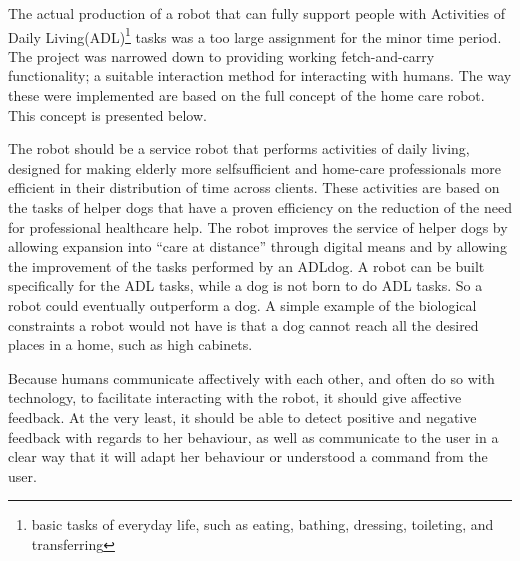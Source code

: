 \documentclass[project_eva.tex]{subfiles}
\begin{document}
The actual production of a robot that can fully support people with Activities of Daily Living(ADL)\footnote{basic tasks of everyday life, such as eating, bathing, dressing, toileting, and transferring}  tasks was a too large assignment for the minor time period. The project was narrowed down to providing working fetch-and-carry functionality; a suitable interaction method for interacting with humans. The way these were implemented are based on the full concept of the home care robot. This concept is presented below.

The robot should be a service robot that performs activities of daily living, designed for making elderly more selfsufficient\cite{Forlizzi} and home-care professionals more efficient in their distribution of time across clients. These 
activities are based on the tasks of helper dogs that have a proven efficiency on the reduction of the need for 
professional healthcare help\cite{Diepenhorst}. The robot improves the service of helper dogs by allowing 
expansion into ``care at distance'' \cite{Evers} through digital means and by allowing the improvement of the tasks 
performed by an ADLdog. A robot can be built specifically for the ADL tasks, while a dog is not born to do ADL tasks. So a robot could eventually outperform a dog.  A simple example of the biological constraints a robot would not have is that a dog cannot reach all the desired places in a home, such as high cabinets.

Because humans communicate affectively with each other, and often do so with technology, to facilitate interacting with the robot, it should give affective feedback. At the very least, it should be able to detect positive and negative feedback with regards to her behaviour, as well as communicate to the user in a clear way that it will adapt her behaviour or understood a command from the user.
\end{document}

